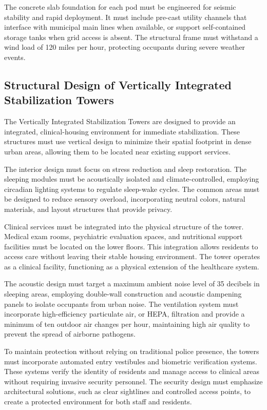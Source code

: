\documentclass[12pt]{article}
\begin{document}
The concrete slab foundation for each pod must be engineered for seismic stability and rapid deployment. It must include pre-cast utility channels that interface with municipal main lines when available, or support self-contained storage tanks when grid access is absent. The structural frame must withstand a wind load of 120 miles per hour, protecting occupants during severe weather events.

\subsection{Structural Design of Vertically Integrated Stabilization Towers}
The Vertically Integrated Stabilization Towers are designed to provide an integrated, clinical-housing environment for immediate stabilization. These structures must use vertical design to minimize their spatial footprint in dense urban areas, allowing them to be located near existing support services.

The interior design must focus on stress reduction and sleep restoration. The sleeping modules must be acoustically isolated and climate-controlled, employing circadian lighting systems to regulate sleep-wake cycles. The common areas must be designed to reduce sensory overload, incorporating neutral colors, natural materials, and layout structures that provide privacy.

Clinical services must be integrated into the physical structure of the tower. Medical exam rooms, psychiatric evaluation spaces, and nutritional support facilities must be located on the lower floors. This integration allows residents to access care without leaving their stable housing environment. The tower operates as a clinical facility, functioning as a physical extension of the healthcare system.

The acoustic design must target a maximum ambient noise level of 35 decibels in sleeping areas, employing double-wall construction and acoustic dampening panels to isolate occupants from urban noise. The ventilation system must incorporate high-efficiency particulate air, or HEPA, filtration and provide a minimum of ten outdoor air changes per hour, maintaining high air quality to prevent the spread of airborne pathogens.

To maintain protection without relying on traditional police presence, the towers must incorporate automated entry vestibules and biometric verification systems. These systems verify the identity of residents and manage access to clinical areas without requiring invasive security personnel. The security design must emphasize architectural solutions, such as clear sightlines and controlled access points, to create a protected environment for both staff and residents.
\end{document}
